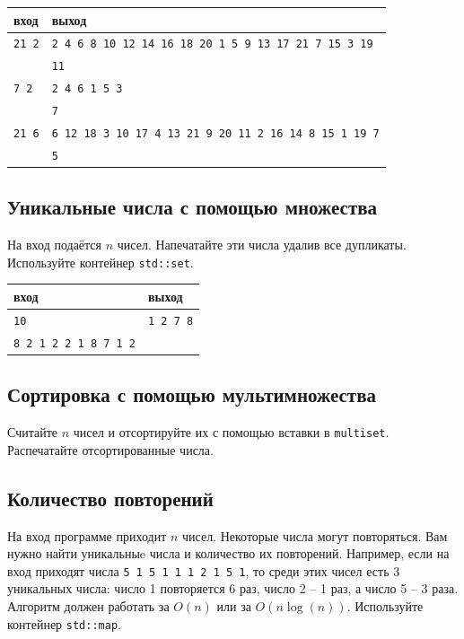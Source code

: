 \documentclass{article}
\begin{document}
\begin{center}
\begin{tabular}{ l | l }
 вход & выход \\ \hline
 \texttt{21 2} & \texttt{2 4 6 8 10 12 14 16 18 20 1 5 9 13 17 21 7 15 3 19}\\
 			   & \texttt{11} \\ \hline
 \texttt{7 2} & \texttt{2 4 6 1 5 3}\\
 			   & \texttt{7} \\ \hline
 \texttt{21 6} & \texttt{6 12 18 3 10 17 4 13 21 9 20 11 2 16 14 8 15 1 19 7}\\
 			   & \texttt{5} \\
\end{tabular}
\end{center}




\subsection{Уникальные числа с помощью множества}
На вход подаётся $n$ чисел. Напечатайте эти числа удалив все дупликаты. Используйте контейнер \texttt{std::set}.
\begin{center}
\begin{tabular}{ l | l }
 вход & выход \\ \hline
 \texttt{10} & \texttt{1 2 7 8}  \\ 
 \texttt{8 2 1 2 2 1 8 7 1 2} &  \\
\end{tabular}
\end{center}

\subsection{Сортировка с помощью мультимножества}
Считайте $n$ чисел и отсортируйте их с помощью вставки в \texttt{multiset}. Распечатайте отсортированные числа.

\subsection{Количество повторений}
На вход программе приходит $n$ чисел. Некоторые числа могут повторяться. Вам нужно найти уникальныe числа и количество их повторений. Например, если на вход приходят числа \texttt{5 1 5 1 1 1 2 1 5 1}, то среди этих чисел есть 3 уникальных числа: число 1 повторяется 6 раз, число 2 -- 1 раз, а число 5 -- 3 раза. Алгоритм должен работать за $O(n)$ или за $O(n \log(n))$. Используйте контейнер \texttt{std::map}.
\end{document}
